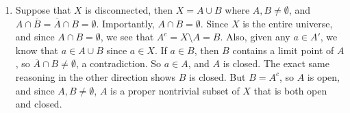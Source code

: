 \documentclass[12pt]{article}
\theoremstyle{definition}
\theoremstyle{remark}
\begin{document}
\begin{enumerate}[leftmargin=\labelsep]
		\item Suppose that $X$ is disconnected, then $X = A \cup B$ where $A, B \neq \emptyset$, and $A \cap \overline{B} = \overline{A} \cap B = \emptyset$. Importantly, $A \cap B = \emptyset$. Since $X$ is the entire universe, and since $A \cap B = \emptyset$, we see that $A^c = X \setminus A = B$. Also, given any $a \in A'$, we know that $a \in A \cup B$ since $a \in X$. If $a \in B$, then $B$ contains a limit point of $A$, so $\overline{A} \cap B \neq \emptyset$, a contradiction. So $a \in A$, and $A$ is closed. The exact same reasoning in the other direction shows $B$ is closed. But $B = A^c$, so $A$ is open, and since $A, B \neq \emptyset$, $A$ is a proper nontrivial subset of $X$ that is both open and closed.
	\end{enumerate}
\end{document}
